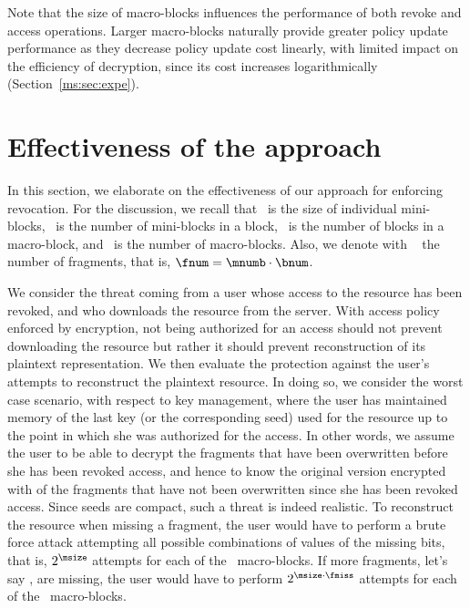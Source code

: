 Note that the size of macro-blocks influences the performance of both revoke and access operations. Larger macro-blocks naturally provide greater policy update performance as they decrease policy update cost linearly, with limited impact on the efficiency of decryption, since its cost increases logarithmically (Section~\ref{ms:sec:expe}).


\section{Effectiveness of the approach}\label{ms:sec:security}

In this section, we elaborate on the effectiveness of our approach for enforcing revocation. For the discussion, we recall that \msize\ is the size of individual mini-blocks, \mnumb\ is the number of mini-blocks in a block, \bnum\ is the number of blocks in a macro-block, and \Mnum\ is the number of macro-blocks. Also, we denote with \fnum\ \! the number of fragments, that is, $\fnum=\mnumb \cdot \bnum$.

We consider the threat coming from a user whose access to the resource has been revoked, and who downloads the resource from the server. With access policy enforced by encryption, not being authorized for an access should not prevent downloading the resource but rather it should prevent reconstruction of its plaintext representation. We then evaluate the protection against the user's attempts to reconstruct the plaintext resource. In doing so, we consider the worst case scenario, with respect to key management, where the user has maintained memory of the last key (or the corresponding seed) used for the resource up to the point in which she was authorized for the access. In other words, we assume the user to be able to decrypt the fragments that have been overwritten before she has been revoked access, and hence to know the original version encrypted with  of the fragments that have not been overwritten since she has been revoked access. Since seeds are compact, such a threat is indeed realistic. To reconstruct the resource when missing a fragment, the user would have to perform a brute force attack attempting all possible combinations of values of the missing bits, that is, $2^{\tiny\msize}$ attempts for each of the \Mnum\ macro-blocks. If more fragments, let's say \fmiss, are missing, the user would have to perform $2^{\tiny{\msize}\cdot \fmiss}$ attempts for each of the \Mnum\ macro-blocks. 


